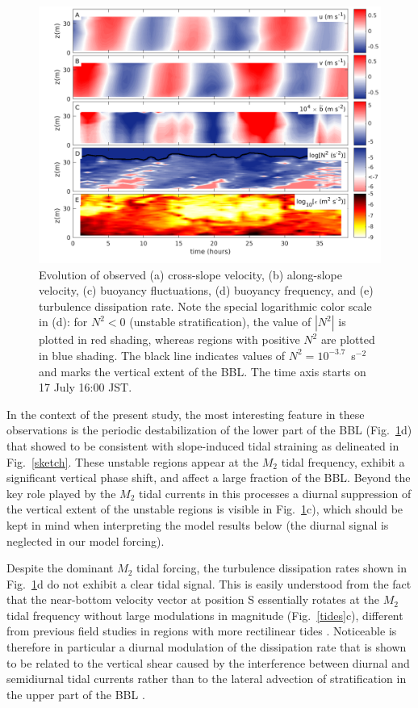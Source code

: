 \begin{figure}
  \noindent\includegraphics[width=40pc]{daten_teos10.png}
  \caption{Evolution of observed (a) cross-slope velocity, (b)
    along-slope velocity, (c) buoyancy fluctuations, (d) buoyancy
    frequency, and (e) turbulence dissipation rate. Note the special
    logarithmic color scale in (d): for $N^2 < 0$ (unstable
    stratification), the value of $| N^2 |$ is plotted in red shading,
    whereas regions with positive $N^2$ are plotted in blue
    shading. The black line indicates values of $N^2 = 10^{-3.7}$~s$^{-2}$ and 
    marks the vertical extent of the BBL. The time axis starts on 17 July 
    16:00 JST.}
  \label{fielddata}
\end{figure}

In the context of the present study, the most interesting feature in
these observations is the periodic destabilization of the lower part
of the BBL (Fig.\ \ref{fielddata}d) that \cite{Endohetal2016a} showed
to be consistent with slope-induced tidal straining as delineated in
Fig.\ \ref{sketch}. These unstable regions appear at the $M_2$ tidal
frequency, exhibit a significant vertical phase shift, and affect a
large fraction of the BBL. Beyond the key role played by the $M_2$
tidal currents in this processes a diurnal suppression of the vertical extent 
of 
the unstable regions is visible in Fig.\ \ref{fielddata}c), which should be 
kept in mind when interpreting the model results below (the diurnal signal is 
neglected in our model forcing).

Despite the dominant $M_2$ tidal forcing, the turbulence dissipation
rates shown in Fig.\ \ref{fielddata}d do not exhibit a clear tidal
signal. This is easily understood from the fact that the near-bottom
velocity vector at position S essentially rotates at the $M_2$ tidal
frequency without large modulations in magnitude (Fig.\ \ref{tides}c),
different from previous field studies in regions with more rectilinear
tides \citep[e.g.][]{Simpsonetal2002,Burchardetal2002a}. Noticeable is 
therefore 
in particular a diurnal modulation of the dissipation rate that is shown to be 
related to the vertical shear caused by the interference between diurnal and 
semidiurnal tidal currents rather than to the lateral advection of 
stratification in the upper part of the BBL \citep{Wakataetal2016a}.


